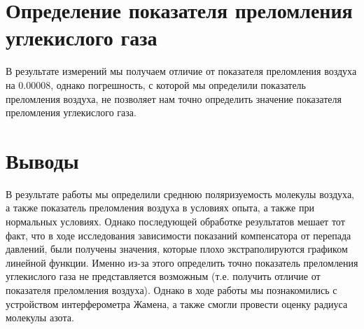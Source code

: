 \documentclass[12pt]{article}
\begin{document}
\section*{Определение показателя преломления углекислого газа}	
\par
	В результате измерений мы получаем отличие от показателя преломления воздуха на 0.00008, однако погрешность, с которой мы определили показатель преломления воздуха, не позволяет нам точно определить значение показателя преломления углекислого газа.

\section*{Выводы}
\par
	В результате работы мы определили среднюю поляризуемость молекулы воздуха, а также показатель преломления воздуха в условиях опыта, а также при нормальных условиях. Однако последующей обработке результатов мешает тот факт, что в ходе исследования зависимости показаний компенсатора от перепада давлений, были получены значения, которые плохо экстраполируются графиком линейной функции. Именно из-за этого определить точно показатель преломления углекислого газа не представляется возможным (т.е. получить отличие от показателя преломления воздуха). Однако в ходе работы мы познакомились с устройством интерферометра Жамена, а также смогли провести оценку радиуса молекулы азота.
\end{document}
